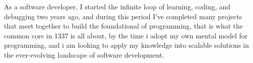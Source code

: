 

\begin{cvparagraph}

As a software developer, I started the infinite loop of learning, coding, and
debugging two years ago, and during this period I've completed many projects
that meet together to build the foundational of programming, that is what the
common core in 1337 is all about, by the time i adopt my own mental model for
programming, and i am looking to apply my knowledge into scalable solutions
in the ever-evolving landscape of software development.
\end{cvparagraph}
